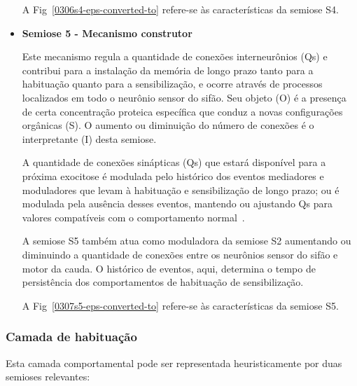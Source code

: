 \begin{itemize}
	A Fig~\ref{0306s4-eps-converted-to} refere-se às características da semiose S4.

	\item \textbf{Semiose 5 - Mecanismo construtor}

	Este mecanismo regula a quantidade de conexões interneurônios (Qs) e contribui para a instalação da memória de longo prazo tanto para a habituação quanto para a sensibilização, e ocorre através de processos localizados em todo o neurônio sensor do sifão. Seu objeto (O) é a presença de certa concentração proteica específica que conduz a novas configurações orgânicas (S). O aumento ou diminuição do número de conexões é o interpretante (I) desta semiose.


	A quantidade de conexões sinápticas (Qs) que estará disponível para a próxima exocitose é modulada pelo histórico dos eventos mediadores e moduladores que levam à habituação e sensibilização de longo prazo; ou é modulada pela ausência desses eventos, mantendo ou ajustando Qs para valores compatíveis com o comportamento normal~\cite{kandel06,kandel00}.

	A semiose S5 também atua como moduladora da semiose S2 aumentando ou diminuindo a quantidade de conexões entre os neurônios sensor do sifão e motor da cauda. O histórico de eventos, aqui, determina o tempo de persistência dos comportamentos de habituação de sensibilização.

	A Fig~\ref{0307s5-eps-converted-to} refere-se às características da semiose S5.

\end{itemize}

\subsubsection*{Camada de habituação}

Esta camada comportamental pode ser representada heuristicamente por duas semioses relevantes:

